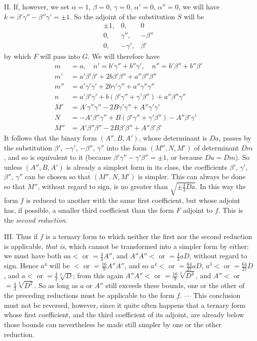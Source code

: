 II. If, however, we set \(\alpha=1\), \(\beta=0\), \(\gamma=0\), \(\alpha'=0\), \(\alpha''=0\), we will have \(k=\beta'\gamma''-\beta''\gamma'=\pm1\). So the adjoint of the substitution \(S\) will be
\[
\begin{array}{rrr}
\pm1,&0,&0\\
0,&\gamma'',&-\beta''\\
0,&-\gamma',&\beta'
\end{array}
\]
by which \(F\) will pass into \(G\). We will therefore have
\[
\begin{aligned}
m&=a,\quad n'=b'\gamma''+b''\gamma',\quad n''=b'\beta''+b''\beta'\\
m'&=a'\beta'\beta'+2b\beta'\beta''+a''\beta''\beta''\\
m''&=a'\gamma'\gamma'+2b\gamma'\gamma''+a''\gamma''\gamma''\\
n&=a'\beta'\gamma'+b(\beta'\gamma''+\gamma'\beta'')+a''\beta''\gamma''\\
M'&=A'\gamma''\gamma''-2B\gamma'\gamma''+A''\gamma'\gamma'\\
N&=-A'\beta''\gamma''+B(\beta'\gamma''+\gamma'\beta'')-A''\beta'\gamma'\\
M''&=A'\beta''\beta''-2B\beta'\beta''+A''\beta'\beta'
\end{aligned}
\]
It follows that the binary form \((A'',B,A')\), whose determinant is \(Da\), passes by the substitution \(\beta'\), \(-\gamma'\), \(-\beta''\), \(\gamma''\) into the form \((M'',N,M')\) of determinant \(Dm\), and so is equivalent to it (because \(\beta'\gamma''-\gamma'\beta''=\pm1\), or because \(Da=Dm\)). So unless \((A'',B,A')\) is already a simplest form in its class, the coefficients \(\beta'\), \(\gamma'\), \(\beta''\), \(\gamma''\) can be chosen so that \((M''.\,N,M')\) is simpler. This can always be done so that \(M''\), without regard to sign, is no greater than \(\sqrt{\pm\frac{4}{3}Da}\). In this way the form \(f\) is reduced to another with the same first coefficient, but whose adjoint has, if possible, a smaller third coefficient than the form \(F\) adjoint to \(f\). This is the \emph{second reduction}.

III. Thus if \(f\) is a ternary form to which neither the first nor the second reduction is applicable, \emph{that is}, which cannot be transformed into a simpler form by either: we must have both \(aa<\) or \(=\frac{4}{3}A''\), and \(A''A''<\) or \(=\frac{4}{3}aD\), without regard to sign. Hence \(a^4\) will be \(<\) or \(=\frac{16}{9}A''A''\), and so \(a^4<\) or \(=\frac{64}{27}aD\), \(a^3<\) or \(=\frac{64}{27}D\), and \(a<\) or \(=\frac{4}{3}\sqrt[3]{D}\); from this again \(A''A''<\) or \(=\frac{16}{9}\sqrt[3]{D^4}\), and \(A''<\) or \(=\frac{4}{3}\sqrt[3]{D^2}\). So as long as \(a\) or \(A''\) still exceeds these bounds, one or the other of the preceding reductions must be applicable to the form \(f\). --- This conclusion must not be reversed, however, since it quite often
happens that a ternary form whose first coefficient, and the third coefficient of its adjoint, are already below those bounds can nevertheless be made still simpler by one or the other reduction.

